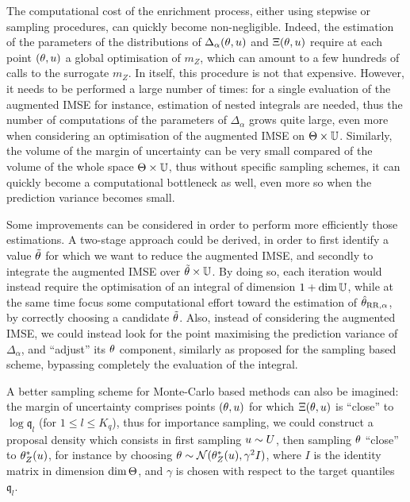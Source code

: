 \documentclass[../../Main_ManuscritThese.tex]{subfiles}
\begin{document}
The computational cost of the enrichment process, either using
stepwise or sampling procedures, can quickly become
non-negligible. Indeed, the estimation of the parameters of the
distributions of $\Delta_{\alpha}(\theta, u)$ and $\Xi(\theta, u)$
require at each point $(\theta, u)$ a global optimisation of $m_Z$,
which can amount to a few hundreds of calls to the surrogate $m_Z$.
In itself, this procedure is not that expensive. However, it needs to
be performed a large number of times: for a single evaluation of the
augmented IMSE for instance, estimation of nested integrals are
needed, thus the number of computations of the parameters of
$\Delta_{\alpha}$ grows quite large, even more when considering an
optimisation of the augmented IMSE on $\Theta
\times\mathbb{U}$. Similarly, the volume of the margin of uncertainty can
be very small compared of the volume of the whole space
$\Theta \times \mathbb{U}$, thus without specific sampling schemes, it
can quickly become a computational bottleneck as well, even more so
when the prediction variance becomes small.

Some improvements can be considered in order to perform more
efficiently those estimations. A two-stage approach could be derived,
in order to first identify a value $\tilde{\theta}$ for which we want to
reduce the augmented IMSE, and secondly to integrate the augmented
IMSE over $\tilde{\theta} \times \mathbb{U}$. By doing so, each iteration
would instead require the optimisation of an integral of dimension
$1 + \dim \mathbb{U}$, while at the same time focus some computational
effort toward the estimation of $\hat{\theta}_{\mathrm{RR},\alpha}$, by
correctly choosing a candidate $\tilde{\theta}$.  Also, instead of
considering the augmented IMSE, we could instead look for the point
maximising the prediction variance of $\Delta_{\alpha}$, and
``adjust'' its $\theta$ component, similarly as proposed for the sampling
based scheme, bypassing completely the evaluation of the integral.



A better sampling scheme for Monte-Carlo based methods can also be
imagined: the margin of uncertainty comprises points $(\theta, u)$ for
which $\Xi(\theta,u)$ is ``close'' to $\log \mathfrak{q}_l$ (for
$1\leq l \leq K_q$), thus for importance sampling, we could construct
a proposal density which consists in first sampling $u \sim U$,
then sampling $\theta$ ``close'' to $\theta^*_Z(u)$, for instance by
choosing $\theta \sim \mathcal{N}(\theta^*_Z(u), \gamma^2 I)$, where $I$
is the identity matrix in dimension $\dim \Theta$, and $\gamma$ is
chosen with respect to the target quantiles $\mathfrak{q}_l$.
\end{document}
